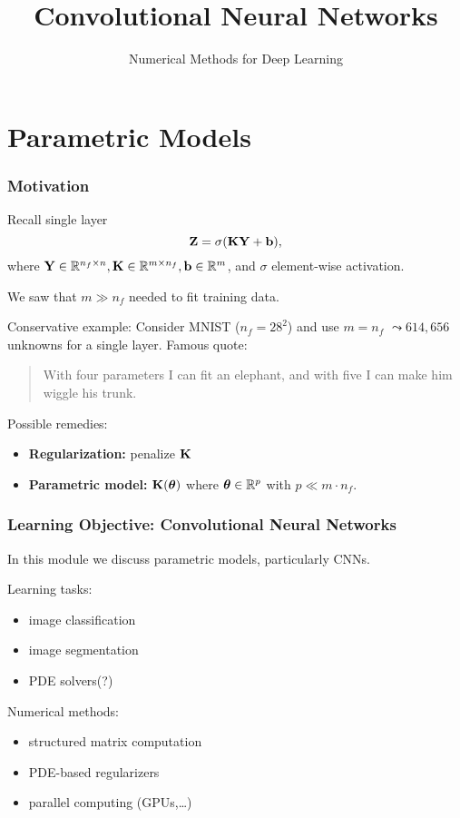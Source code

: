 \documentclass[12pt,fleqn,handout]{beamer}
\title{Convolutional Neural Networks}
\subtitle{Numerical Methods for Deep Learning}
\date{}
\begin{document}
\makebeamertitle

\section{Parametric Models} %
\label{sec:parametric_models}
\begin{frame}[fragile]\frametitle{Motivation}

Recall single layer
$$
	{\bf Z} = \sigma({\bf K}{\bf Y} + {\bf b}),
$$
where ${\bf Y} \in \mathbb{R}^{n_f\times n}, {\bf K} \in \mathbb{R}^{m \times n_f}, {\bf b}\in\mathbb{R}^m$, and $\sigma$ element-wise activation. 

\bigskip
\pause

We saw that $m \gg n_f$ needed to fit training data. 

Conservative example: Consider MNIST ($n_f = 28^2$) and use $m=n_f$ $\leadsto 614,656$ unknowns for a single layer. \pause Famous quote:

\begin{quote}
	With four parameters I can fit an elephant, and with five I can make him wiggle his trunk.
\end{quote}

\bigskip
\pause

Possible remedies:
\begin{itemize}
	\item \textbf{Regularization:} penalize ${\bf K}$ 
	\item \textbf{Parametric model:} ${\bf K}({\boldsymbol \theta})$ where ${\boldsymbol \theta}\in\mathbb{R}^p$ with $p\ll m\cdot n_f$.
\end{itemize}
\end{frame}

\begin{frame}
	\frametitle{Learning Objective: Convolutional Neural Networks}
	
	In this module we discuss parametric models, particularly CNNs.
	
	\bigskip
	
	Learning tasks:
	\begin{itemize}
		\item image classification
		\item image segmentation
		\item PDE solvers(?)
	\end{itemize}
	
	\bigskip
	
	Numerical methods:
	\begin{itemize}
		\item structured matrix computation
		\item PDE-based regularizers
		\item parallel computing (GPUs,\ldots)
	\end{itemize}
\end{frame}
\end{document}
